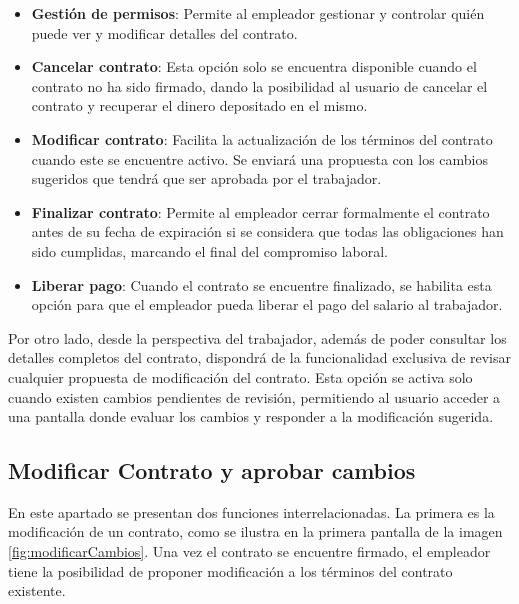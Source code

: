 \begin{itemize}
\item \textbf{Gestión de permisos}: Permite al empleador gestionar y controlar quién puede ver y modificar detalles del contrato.

\item \textbf{Cancelar contrato}: Esta opción solo se encuentra disponible cuando el contrato no ha sido firmado, dando la posibilidad al usuario de cancelar el contrato y recuperar el dinero depositado en el mismo.

\item \textbf{Modificar contrato}: Facilita la actualización de los términos del contrato cuando este se encuentre activo. Se enviará una propuesta con los cambios sugeridos que tendrá que ser aprobada por el trabajador.

\item \textbf{Finalizar contrato}: Permite al empleador cerrar formalmente el contrato antes de su fecha de expiración si se considera que todas las obligaciones han sido cumplidas, marcando el final del compromiso laboral.

\item \textbf{Liberar pago}: Cuando el contrato se encuentre finalizado, se habilita esta opción para que el empleador pueda liberar el pago del salario al trabajador.
\end{itemize}

Por otro lado, desde la perspectiva del trabajador, además de poder consultar los detalles completos del contrato, dispondrá de la funcionalidad exclusiva de revisar cualquier propuesta de modificación del contrato. Esta opción se activa solo cuando existen cambios pendientes de revisión, permitiendo al usuario acceder a una pantalla donde evaluar los cambios y responder a la modificación sugerida.


\subsection{Modificar Contrato y aprobar cambios}

En este apartado se presentan dos funciones interrelacionadas. La primera es la modificación de un contrato, como se ilustra en la primera pantalla de la imagen \ref{fig:modificarCambios}. 
Una vez el contrato se encuentre firmado, el empleador tiene la posibilidad de proponer modificación a los términos del contrato existente. 

